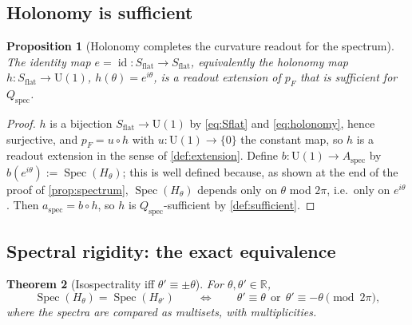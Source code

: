 \documentclass[11pt,reqno]{amsart}
\theoremstyle{plain}
\newtheorem{theorem}{Theorem}[section]
\newtheorem{proposition}[theorem]{Proposition}
\theoremstyle{definition}
\newcommand{\Rr}{\mathbb{R}}
\newcommand{\Uone}{\mathrm{U}(1)}
\newcommand{\Src}{S}
\newcommand{\Spec}{\operatorname{Spec}}
\newcommand{\id}{\operatorname{id}}
\begin{document}
\subsection{Holonomy is sufficient}

\begin{proposition}[Holonomy completes the curvature readout for the
spectrum]\label{prop:holonomy-sufficient}
The identity map $e=\id\colon\Src_{\mathrm{flat}}\to\Src_{\mathrm{flat}}$, equivalently the
holonomy map $h\colon\Src_{\mathrm{flat}}\to\Uone$, $h(\theta)=e^{i\theta}$, is a readout
extension of $p_F$ that is sufficient for $Q_{\mathrm{spec}}$.
\end{proposition}

\begin{proof}
$h$ is a bijection $\Src_{\mathrm{flat}}\to\Uone$ by \eqref{eq:Sflat} and \eqref{eq:holonomy},
hence surjective, and $p_F=u\circ h$ with $u\colon\Uone\to\{0\}$ the constant map, so $h$ is a
readout extension in the sense of \cref{def:extension}. Define
$b\colon\Uone\to A_{\mathrm{spec}}$ by $b(e^{i\theta}):=\Spec(H_\theta)$; this is well defined
because, as shown at the end of the proof of \cref{prop:spectrum}, $\Spec(H_\theta)$ depends only
on $\theta$ mod $2\pi$, i.e.\ only on $e^{i\theta}$. Then
$a_{\mathrm{spec}}=b\circ h$, so $h$ is $Q_{\mathrm{spec}}$-sufficient by \cref{def:sufficient}.
\end{proof}

\subsection{Spectral rigidity: the exact equivalence}

\begin{theorem}[Isospectrality iff $\theta'\equiv\pm\theta$]\label{thm:isospectral}
For $\theta,\theta'\in\Rr$,
\begin{equation}\label{eq:isospectral}
\Spec(H_\theta)=\Spec(H_{\theta'})
\qquad\Longleftrightarrow\qquad
\theta'\equiv\theta \ \ \text{or}\ \ \theta'\equiv-\theta \pmod{2\pi},
\end{equation}
where the spectra are compared as multisets, with multiplicities.
\end{theorem}
\end{document}
